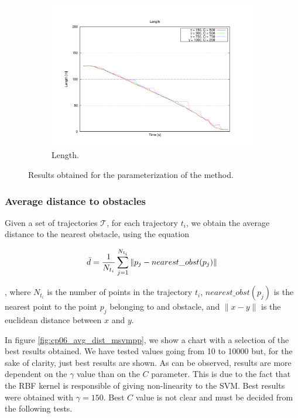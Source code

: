 \begin{figure}[h!]
  \ContinuedFloat
  \begin{subfigure}[b]{\textwidth}
	  \centering
	  \includegraphics[width=\textwidth,height=0.5\textwidth, trim=55 50 85 60,clip]{figure10}
	  \caption{Length.}
	  \label{fig:cp06_length_msvmpp}
  \end{subfigure}
  
  \caption{Results obtained for the parameterization of the method.}\label{fig:cp06_results_parameterization}
\end{figure}

\subsubsection{Average distance to obstacles}\label{ch:chapter06_02_01_01}
Given a set of trajectories $\mathcal{T}$, for each trajectory $t_i$, we obtain the average distance to the nearest obstacle, using the equation

\begin{equation}\label{eq:cp06_avg_dist}
  \bar{d} = {1 \over N_{t_i}} \sum_{j=1}^{N_{t_i}} \| p_j - nearest\_obst(p_j) \|
\end{equation}

, where $N_{t_i}$ is the number of points in the trajectory $t_i$, $nearest\_obst(p_j)$ is the nearest point to the point $p_j$ belonging to and obstacle, and $\| x - y \|$ is the euclidean distance between $x$ and $y$.

In figure \ref{fig:cp06_avg_dist_msvmpp}, we show a chart with a selection of the best results obtained. We have tested values going from 10 to 10000 but, for the sake of clarity, just best results are shown. As can be observed, results are more dependent on the $\gamma$ value than on the $C$ parameter. This is due to the fact that the \ac{RBF} kernel is responsible of giving non-linearity to the \ac{SVM}. Best results were obtained with $\gamma = 150$. Best $C$ value is not clear and must be decided from the following tests.

